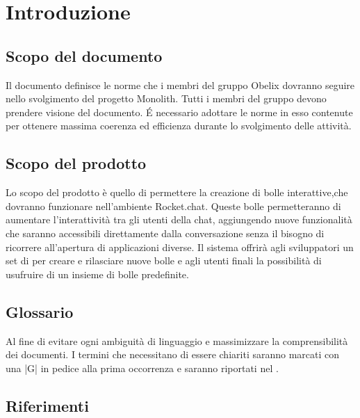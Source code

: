 \section{Introduzione}

\subsection{Scopo del documento}

Il documento definisce le norme che i membri del gruppo Obelix
dovranno seguire nello svolgimento del progetto Monolith. Tutti i
membri del gruppo devono prendere visione del documento. \'E necessario
adottare le norme in esso contenute per ottenere massima coerenza ed
efficienza durante lo svolgimento delle attività. 

\subsection{Scopo del prodotto}

Lo scopo del prodotto è quello di permettere la creazione 
di bolle interattive,che dovranno funzionare nell'ambiente
Rocket.chat. Queste bolle permetteranno di aumentare l'interattività
tra gli utenti della chat, aggiungendo nuove funzionalità che
saranno accessibili direttamente dalla conversazione senza il bisogno
di ricorrere all'apertura di applicazioni diverse. 
Il sistema offrirà agli sviluppatori un set di  per creare e
rilasciare nuove bolle e agli utenti finali la possibilità di
usufruire di un insieme di bolle predefinite.  

\subsection{Glossario}

Al fine di evitare ogni ambiguità di linguaggio e massimizzare la
comprensibilità dei documenti. I termini che necessitano di essere
chiariti saranno marcati con una |G| in pedice alla prima occorrenza e saranno
riportati nel \gloss. 

\subsection{Riferimenti}

